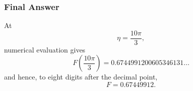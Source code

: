 
\subsubsection*{Final Answer}
At
\[
\eta=\frac{10\pi}{3},
\]
numerical evaluation gives
\[
\boxed{
F\!\left(\frac{10\pi}{3}\right)
=
0.6744991200605346131\ldots
}
\]
and hence, to eight digits after the decimal point,
\[
\boxed{F=0.67449912}.
\]
